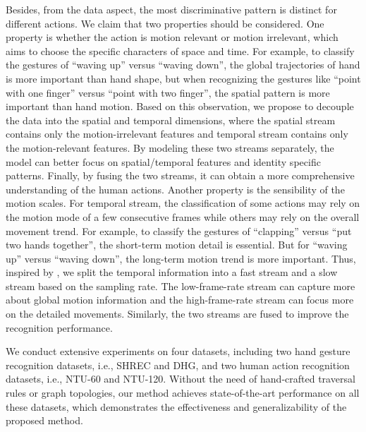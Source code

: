 \documentclass[runningheads]{llncs}
\begin{document}
Besides, from the data aspect, the most discriminative pattern is distinct for different actions. 
We claim that two properties should be considered. 
One property is whether the action is motion relevant or motion irrelevant, which aims to choose the specific characters of space and time. 
For example, to classify the gestures of ``waving up'' versus ``waving down'', the global trajectories of hand is more important than hand shape, but when recognizing the gestures like ``point with one finger'' versus ``point with two finger'', the spatial pattern is more important than hand motion. 
Based on this observation, we propose to decouple the data into the spatial and temporal dimensions, where the spatial stream contains only the motion-irrelevant features and temporal stream contains only the motion-relevant features. 
By modeling these two streams separately, the model can better focus on spatial/temporal features and identity specific patterns. 
Finally, by fusing the two streams, it can obtain a more comprehensive understanding of the human actions. 
Another property is the sensibility of the motion scales. 
For temporal stream, the classification of some actions may rely on the motion mode of a few consecutive frames while others may rely on the overall movement trend. 
For example, to classify the gestures of ``clapping'' versus ``put two hands together'', the short-term motion detail is essential. 
But for ``waving up'' versus ``waving down'', the long-term motion trend is more important. 
Thus, inspired by \cite{feichtenhofer_slowfast_2019}, we split the temporal information into a fast stream and a slow stream based on the sampling rate. 
The low-frame-rate stream can capture more about global motion information and the high-frame-rate stream can focus more on the detailed movements. 
Similarly, the two streams are fused to improve the recognition performance. 


We conduct extensive experiments on four datasets, including two hand gesture recognition datasets, i.e., SHREC and DHG, and two human action recognition datasets, i.e., NTU-60 and NTU-120.
Without the need of hand-crafted traversal rules or graph topologies, our method achieves state-of-the-art performance on all these datasets, which demonstrates the effectiveness and generalizability of the proposed method. 
\end{document}
